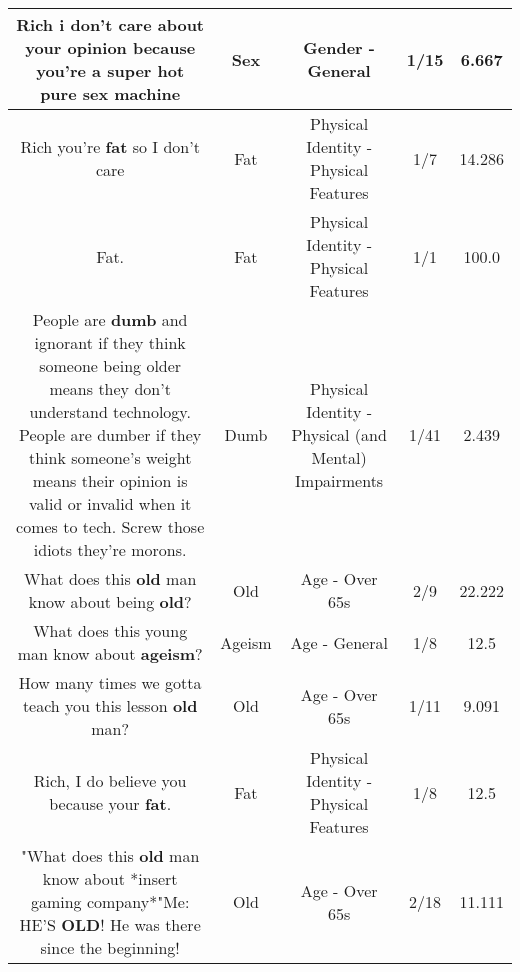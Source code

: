 \documentclass[11pt]{article}
\newlength\mylength
\begin{document}
\begin{center}
\begin{longtable}{|C{.65\mylength}|C{.30\mylength}|C{.12\mylength}|C{.12\mylength}|C{.12\mylength}|}
  \small Rich i don't care about your opinion because you're a super hot pure \textbf{sex} machine\normalsize   & Sex & Gender - General & 1/15 & 6.667 \\  \hline
  \small Rich you're \textbf{fat} so I don't care\normalsize   & Fat & Physical Identity - Physical Features & 1/7 & 14.286 \\  \hline
  \small Fat.\normalsize   & Fat & Physical Identity - Physical Features & 1/1 & 100.0 \\  \hline
  \small People are \textbf{dumb} and ignorant if they think someone being older means they don't understand technology. People are dumber if they think someone's weight means their opinion is valid or invalid when it comes to tech. Screw those idiots they're morons.\normalsize   & Dumb & Physical Identity - Physical (and Mental) Impairments & 1/41 & 2.439 \\  \hline
  \small What does this \textbf{old} man know about being \textbf{old}?\normalsize   & Old & Age - Over 65s & 2/9 & 22.222 \\  \hline
  \small What does this young man know about \textbf{ageism}?\normalsize   & Ageism & Age - General & 1/8 & 12.5 \\  \hline
  \small How many times we gotta teach you this lesson \textbf{old} man?\normalsize   & Old & Age - Over 65s & 1/11 & 9.091 \\  \hline
  \small Rich, I do believe you because your \textbf{fat}.\normalsize   & Fat & Physical Identity - Physical Features & 1/8 & 12.5 \\  \hline
  \small "What does this \textbf{old} man know about *insert gaming company*"Me: HE'S \textbf{OLD}! He was there since the beginning!\normalsize   & Old & Age - Over 65s & 2/18 & 11.111 \\  \hline

\end{longtable}
\end{center}
\end{document}
